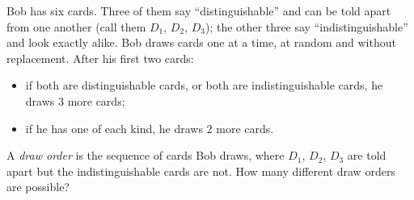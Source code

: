 Bob has six cards. Three of them say ``distinguishable'' and can be told apart from one another (call them $D_1$, $D_2$, $D_3$); the other three say ``indistinguishable'' and look exactly alike. Bob draws cards one at a time, at random and without replacement. After his first two cards:
\begin{itemize}
\item if both are distinguishable cards, or both are indistinguishable cards, he draws $3$ more cards;
\item if he has one of each kind, he draws $2$ more cards.
\end{itemize}
A \emph{draw order} is the sequence of cards Bob draws, where $D_1$, $D_2$, $D_3$ are told apart but the indistinguishable cards are not. How many different draw orders are possible?
